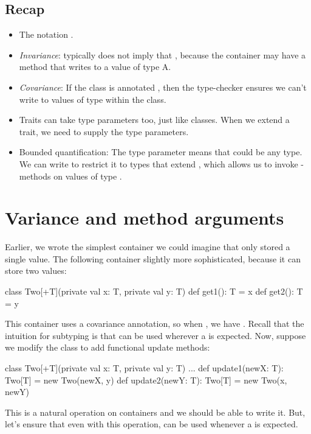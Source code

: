 \documentclass[9pt]{extbook}
\begin{document}
\newlecture

\begin{instructor}

\section{Recap}

\begin{itemize}
  \item The notation .
  \item \emph{Invariance}: typically  does not imply that , because the container may have a method that writes to a value of type A.
  \item \emph{Covariance}: If the class is annotated , then the type-checker ensures we can't write to values of type  within the class.
  \item Traits can take type parameters too, just like classes. When we extend a trait, we need to supply the type parameters.
  \item Bounded quantification: The type parameter means that  could be any type. We can write  to restrict it to types that extend , which allows us to invoke -methods on values of type .
\end{itemize}
\end{instructor}

\section{Variance and method arguments}

Earlier, we wrote the simplest container we could imagine that only stored
a single value. The following container slightly more sophisticated, because
it can store two values:
\begin{scalacode}
class Two[+T](private val x: T, private val y: T) {
  def get1(): T = x
  def get2(): T = y
}
\end{scalacode}
This container uses a covariance annotation, so when ,
we have . Recall that the
intuition for subtyping is that  can be used
wherever a  is expected. Now, suppose we modify the class to
add functional update methods:
\begin{scalacode}
class Two[+T](private val x: T, private val y: T) {
  ...
  def update1(newX: T): Two[T] = new Two(newX, y)
  def update2(newY: T): Two[T] = new Two(x, newY)
}
\end{scalacode}
This is a natural operation on containers and we should be able to write it.
But, let's ensure that even with this operation,  can
be used whenever a  is expected.
\end{document}
